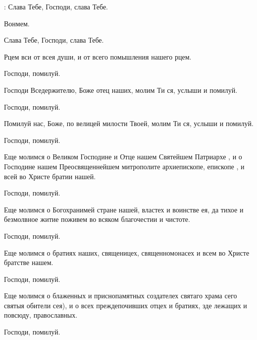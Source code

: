 \begin{mymulticols}
: Слава Тебе, Господи, слава Тебе.

 Вонмем.



 Слава Тебе, Господи, слава Тебе.



 Рцем вси от всея души, и от всего помышления нашего рцем.

 Господи, помилуй.

 Господи Вседержителю, Боже отец наших, молим Ти ся, услыши и помилуй.

 Господи, помилуй.

 Помилуй нас, Боже, по велицей милости Твоей, молим Ти ся, услыши и помилуй.

 Господи, помилуй.  

 Еще молимся о Великом Господине и Отце нашем Святейшем Патриархе , и о Господине нашем Преосвященнейшем митрополите  архиепископе,  епископе , и всей во Христе братии нашей. 

 Господи, помилуй.  

 Еще молимся о Богохранимей стране нашей, властех и воинстве ея, да тихое и безмолвное житие поживем во всяком благочестии и чистоте. 

 Господи, помилуй.  

 Еще молимся о братиях наших, священицех, священномонасех и всем во Христе братстве нашем.

 Господи, помилуй.  

 Еще молимся о блаженных и приснопамятных создателех святаго храма сего  святыя обители сея), и о всех преждепочивших отцех и братиях, зде лежащих и повсюду, православных. 

 Господи, помилуй.  


\end{mymulticols}
